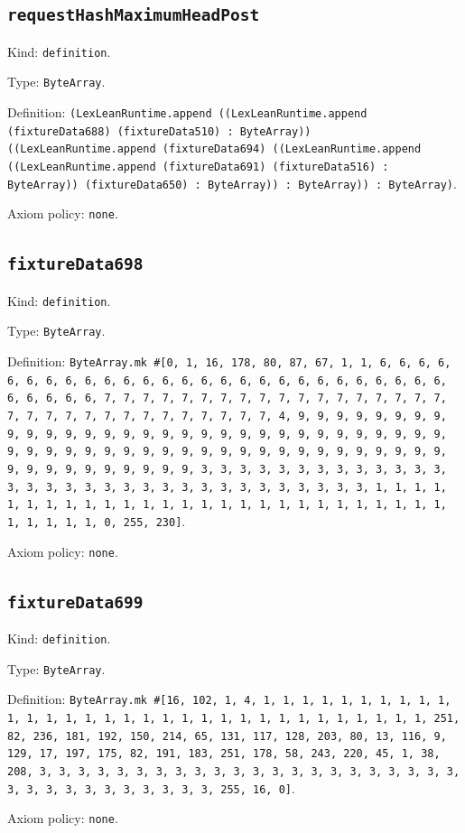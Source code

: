 \documentclass[11pt]{article}
\begin{document}
\subsection*{\texttt{requestHashMaximumHeadPost}}
\noindent Kind: \texttt{definition}.\par
\noindent Type: \texttt{ByteArray}.\par
\noindent Definition: \texttt{(LexLeanRuntime.append ((LexLeanRuntime.append (fixtureData688) (fixtureData510) : ByteArray)) ((LexLeanRuntime.append (fixtureData694) ((LexLeanRuntime.append ((LexLeanRuntime.append (fixtureData691) (fixtureData516) : ByteArray)) (fixtureData650) : ByteArray)) : ByteArray)) : ByteArray)}.\par
\noindent Axiom policy: \texttt{none}.\par
\subsection*{\texttt{fixtureData698}}
\noindent Kind: \texttt{definition}.\par
\noindent Type: \texttt{ByteArray}.\par
\noindent Definition: \texttt{ByteArray.mk \#[0, 1, 16, 178, 80, 87, 67, 1, 1, 6, 6, 6, 6, 6, 6, 6, 6, 6, 6, 6, 6, 6, 6, 6, 6, 6, 6, 6, 6, 6, 6, 6, 6, 6, 6, 6, 6, 6, 6, 6, 6, 7, 7, 7, 7, 7, 7, 7, 7, 7, 7, 7, 7, 7, 7, 7, 7, 7, 7, 7, 7, 7, 7, 7, 7, 7, 7, 7, 7, 7, 7, 7, 7, 4, 9, 9, 9, 9, 9, 9, 9, 9, 9, 9, 9, 9, 9, 9, 9, 9, 9, 9, 9, 9, 9, 9, 9, 9, 9, 9, 9, 9, 9, 9, 9, 9, 9, 9, 9, 9, 9, 9, 9, 9, 9, 9, 9, 9, 9, 9, 9, 9, 9, 9, 9, 9, 9, 9, 9, 9, 9, 9, 9, 9, 9, 9, 9, 9, 3, 3, 3, 3, 3, 3, 3, 3, 3, 3, 3, 3, 3, 3, 3, 3, 3, 3, 3, 3, 3, 3, 3, 3, 3, 3, 3, 3, 3, 3, 3, 3, 1, 1, 1, 1, 1, 1, 1, 1, 1, 1, 1, 1, 1, 1, 1, 1, 1, 1, 1, 1, 1, 1, 1, 1, 1, 1, 1, 1, 1, 1, 1, 1, 0, 255, 230]}.\par
\noindent Axiom policy: \texttt{none}.\par
\subsection*{\texttt{fixtureData699}}
\noindent Kind: \texttt{definition}.\par
\noindent Type: \texttt{ByteArray}.\par
\noindent Definition: \texttt{ByteArray.mk \#[16, 102, 1, 4, 1, 1, 1, 1, 1, 1, 1, 1, 1, 1, 1, 1, 1, 1, 1, 1, 1, 1, 1, 1, 1, 1, 1, 1, 1, 1, 1, 1, 1, 1, 1, 1, 251, 82, 236, 181, 192, 150, 214, 65, 131, 117, 128, 203, 80, 13, 116, 9, 129, 17, 197, 175, 82, 191, 183, 251, 178, 58, 243, 220, 45, 1, 38, 208, 3, 3, 3, 3, 3, 3, 3, 3, 3, 3, 3, 3, 3, 3, 3, 3, 3, 3, 3, 3, 3, 3, 3, 3, 3, 3, 3, 3, 3, 3, 3, 3, 3, 255, 16, 0]}.\par
\noindent Axiom policy: \texttt{none}.\par
\end{document}
